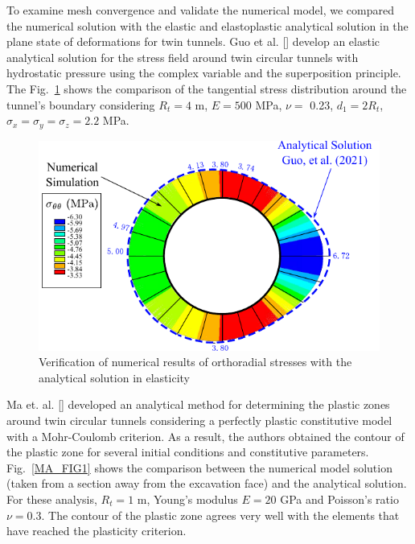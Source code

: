 \documentclass[a4paper,fleqn]{cas-sc}
\begin{document}
To examine mesh convergence and validate the numerical model, we compared the numerical solution with the elastic and elastoplastic analytical solution in the plane state of deformations for twin tunnels. Guo et al. [] develop an elastic analytical solution for the stress field around twin circular tunnels with hydrostatic pressure using the complex variable and the superposition principle. The Fig.~\ref{GUO_FIG1} shows the comparison of the tangential stress distribution around the tunnel's boundary considering  $R_t = 4$ m, $E = 500$ MPa, $\nu =$ 0.23, $d_1 = 2R_t$, $\sigma_x = \sigma_y  = \sigma_z = 2.2$ MPa.
\begin{figure}[h!]
	\centering
	\includegraphics[scale=1]{GUO_FIG1.pdf}
	\caption{Verification of numerical results of orthoradial stresses with the analytical solution in elasticity}
	\label{GUO_FIG1}
\end{figure}
\FloatBarrier
Ma et. al. [] developed an analytical method for determining the plastic zones around twin circular tunnels considering a perfectly plastic constitutive model with a Mohr-Coulomb criterion. As a result, the authors obtained the contour of the plastic zone for several initial conditions and constitutive parameters. Fig.~\ref{MA_FIG1} shows the comparison between the numerical model solution (taken from a section away from the excavation face) and the analytical solution. For these analysis, $R_t = 1$ m, Young's modulus $E=20$ GPa and Poisson's ratio $\nu = 0.3$. The contour of the plastic zone agrees very well with the elements that have reached the plasticity criterion.
\end{document}
